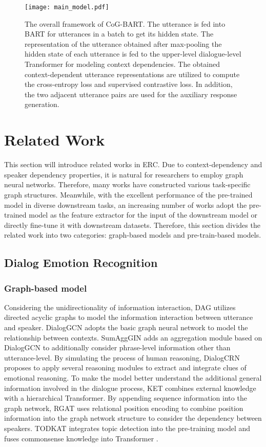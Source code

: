 \documentclass[letterpaper]{article} \usepackage{aaai22}  \usepackage{times}  \usepackage{helvet}  \usepackage{courier}  \usepackage[hyphens]{url}  \usepackage{graphicx} \urlstyle{rm} \def\UrlFont{\rm}  \usepackage{natbib}  \usepackage{caption} \DeclareCaptionStyle{ruled}{labelfont=normalfont,labelsep=colon,strut=off} \frenchspacing  \setlength{\pdfpagewidth}{8.5in}  \setlength{\pdfpageheight}{11in}  \usepackage{algorithm}
\begin{document}
\begin{figure*}[t]
\centering
\texttt{[image: main\_model.pdf]} \caption{The overall framework of CoG-BART. The utterance is fed into BART for  utterances in a batch to get its hidden state. The representation of the utterance obtained after max-pooling the hidden state of each utterance is fed to the upper-level dialogue-level Transformer for modeling context dependencies. The obtained context-dependent utterance representations are utilized to compute the cross-entropy loss and supervised contrastive loss. In addition, the two adjacent utterance pairs are used for the auxiliary response generation.}
\label{fig1}
\end{figure*}


\section{Related Work}
This section will introduce related works in ERC. Due to context-dependency and speaker dependency properties, it is natural for researchers to employ graph neural networks. Therefore, many works have constructed various task-specific graph structures. Meanwhile, with the excellent performance of the pre-trained model in diverse downstream tasks, an increasing number of works adopt the pre-trained model as the feature extractor for the input of the downstream model or directly fine-tune it with downstream datasets. Therefore, this section divides the related work into two categories: graph-based models and pre-train-based models.

\subsection{Dialog Emotion Recognition}
\subsubsection{Graph-based model}
Considering the unidirectionality of information interaction, DAG \cite{dag-erc} utilizes directed acyclic graphs to model the information interaction between utterance and speaker. DialogGCN \cite{ghosal-etal-2019-dialoguegcn} adopts the basic graph neural network to model the relationship between contexts. SumAggGIN \cite{sheng-etal-2020-sumagggin} adds an aggregation module based on DialogGCN to additionally consider phrase-level information other than utterance-level. By simulating the process of human reasoning, DialogCRN \cite{dialogcrn} proposes to apply several reasoning modules to extract and integrate clues of emotional reasoning. To make the model better understand the additional general information involved in the dialogue process, KET \cite{zhong-2019-ket} combines external knowledge with a hierarchical Transformer. By appending sequence information into the graph network, RGAT \cite{rgat} uses relational position encoding to combine position information into the graph network structure to consider the dependency between speakers. TODKAT \cite{todkat} integrates topic detection into the pre-training model and fuses commonsense knowledge into Transformer \cite{transformer-nips-2017}.
\end{document}
